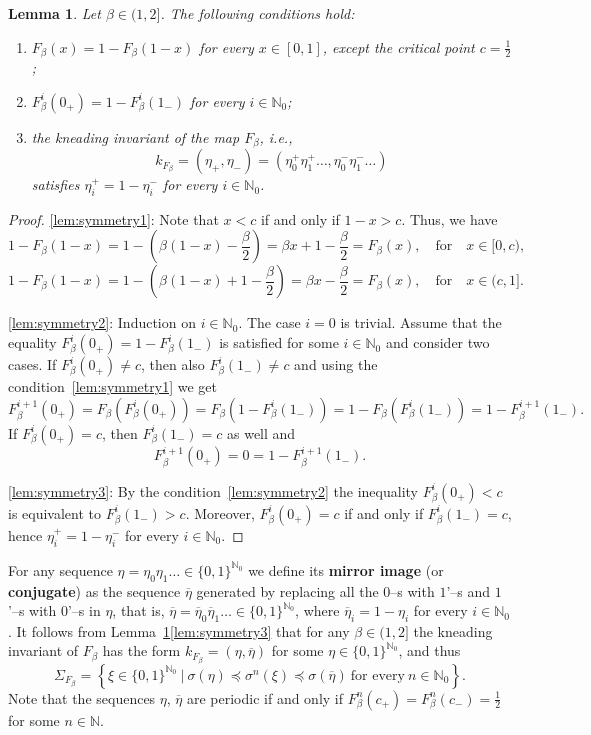 \documentclass[10pt,reqno]{amsart}
\theoremstyle{plain}
\theoremstyle{assumption}
\theoremstyle{notation}
\theoremstyle{claim}
\theoremstyle{conj}
\theoremstyle{theorem}
\theoremstyle{proposition}
\theoremstyle{corollary}
\newtheorem{lemma}{Lemma}[section]
\begin{document}
\begin{lemma}\label{lem:symmetry}
Let $\beta\in(1,2]$. The following conditions hold:
\begin{enumerate}
    \item\label{lem:symmetry1} $F_{\beta}(x)=1-F_{\beta}(1-x)$ for every $x\in[0,1]$, except the critical point $c=\frac{1}{2}$;
    \item\label{lem:symmetry2} $F_{\beta}^i(0_+)=1-F_{\beta}^i(1_-)$ for every $i\in\mathbb{N}_0$;
    \item\label{lem:symmetry3} the kneading invariant  of the map $F_{\beta}$, i.e.,
    $$
    k_{F_\beta}=(\eta_+,\eta_-)=(\eta^+_0\eta^+_1\ldots,\eta^-_0\eta^-_1\ldots)
    $$ 
    satisfies $\eta_i^+=1-\eta_i^-$ for every $i\in\mathbb{N}_0$.
\end{enumerate}
\end{lemma}
\begin{proof}
    \eqref{lem:symmetry1}: Note that $x<c$ if and only if $1-x>c$. Thus, we have 
    $$
    1-F_{\beta}(1-x)=1-\left(\beta (1-x)-\frac{\beta}{2}\right)=\beta x+1-\frac{\beta}{2}=F_{\beta}(x),\quad\text{for}\quad x\in[0,c),
    $$
    $$
    1-F_{\beta}(1-x)=1-\left(\beta (1-x)+1-\frac{\beta}{2}\right)=\beta x-\frac{\beta}{2}=F_{\beta}(x),\quad\text{for}\quad x\in(c,1].
    $$

    \eqref{lem:symmetry2}: Induction on $i\in\mathbb{N}_0$. The case $i=0$ is trivial. Assume that the equality $F_{\beta}^i(0_+)=1-F_{\beta}^i(1_-)$ is satisfied for some $i\in\mathbb{N}_0$ and consider two cases. If $F_{\beta}^i(0_+)\neq c$, then also $F_{\beta}^i(1_-)\neq c$ and using the condition~\eqref{lem:symmetry1} we get
    $$
    F_{\beta}^{i+1}(0_+)=F_{\beta}(F_{\beta}^{i}(0_+))=F_{\beta}(1-F_{\beta}^i(1_-))=1-F_{\beta}(F_{\beta}^i(1_-))=1-F_{\beta}^{i+1}(1_-).
    $$
    If $F_{\beta}^i(0_+)= c$, then $F_{\beta}^i(1_-)= c$ as well and
    $$
    F_{\beta}^{i+1}(0_+)=0=1-F_{\beta}^{i+1}(1_-).
    $$

    \eqref{lem:symmetry3}: By the condition~\eqref{lem:symmetry2} the inequality $F_{\beta}^i(0_+)<c$ is equivalent to $F_{\beta}^i(1_-)>c$. Moreover, $F_{\beta}^i(0_+)=c$ if and only if $F_{\beta}^i(1_-)=c$, hence $\eta_i^+=1-\eta_i^-$ for every $i\in\mathbb{N}_0$.
\end{proof}
For any sequence $\eta=\eta_0\eta_1\ldots\in\{0,1\}^{\mathbb{N}_0}$ we define its \textbf{mirror image} (or \textbf{conjugate}) as the sequence $\overline{\eta}$ generated by replacing all the $0$--s with $1$'--s and $1$'--s with $0$'--s in $\eta$, that is, $\overline{\eta}=\overline{\eta}_0\overline{\eta}_1\ldots\in\{0,1\}^{\mathbb{N}_0}$, where $\overline{\eta}_i=1-\eta_i$ for every $i\in\mathbb{N}_0$. It follows from Lemma~\ref{lem:symmetry}\eqref{lem:symmetry3} that for any $\beta\in(1,2]$ the kneading invariant of $F_{\beta}$ has the form $k_{F_\beta}=(\eta,\overline{\eta})$ for some $\eta\in\{0,1\}^{\mathbb{N}_0}$, and thus
$$
\Sigma_{F_{\beta}}=\left\{\xi\in\{0,1\}^{\mathbb{N}_0}\:|\: \sigma(\eta)\preccurlyeq\sigma^n(\xi)\preccurlyeq\sigma(\overline{\eta})\ \text{for every}\ n\in\mathbb{N}_0\right\}.
$$
Note that the sequences $\eta$, $\overline{\eta}$ are periodic if and only if $F_{\beta}^n(c_+)=F_{\beta}^n(c_-)=\frac{1}{2}$ for some $n\in\mathbb{N}$. 
\end{document}
